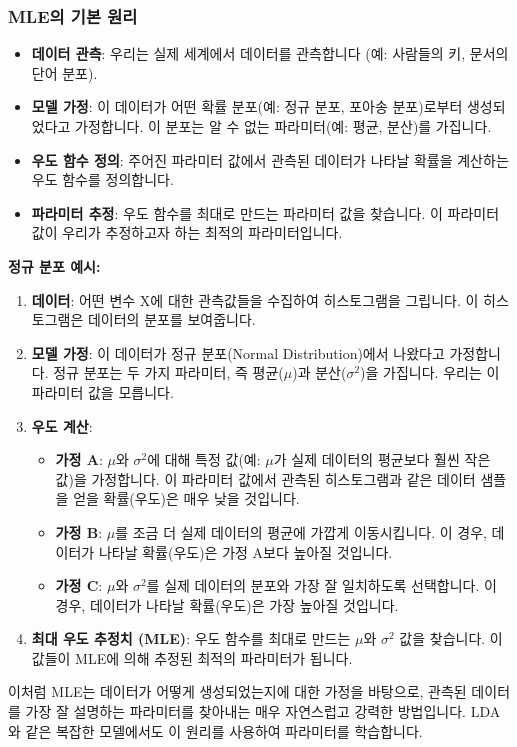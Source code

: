 \documentclass[11pt,a4paper]{article}
\theoremstyle{definition}
\begin{document}
\subsubsection*{MLE의 기본 원리}
\begin{itemize}
    \item \textbf{데이터 관측}: 우리는 실제 세계에서 데이터를 관측합니다 (예: 사람들의 키, 문서의 단어 분포).
    \item \textbf{모델 가정}: 이 데이터가 어떤 확률 분포(예: 정규 분포, 포아송 분포)로부터 생성되었다고 가정합니다. 이 분포는 알 수 없는 파라미터(예: 평균, 분산)를 가집니다.
    \item \textbf{우도 함수 정의}: 주어진 파라미터 값에서 관측된 데이터가 나타날 확률을 계산하는 우도 함수를 정의합니다.
    \item \textbf{파라미터 추정}: 우도 함수를 최대로 만드는 파라미터 값을 찾습니다. 이 파라미터 값이 우리가 추정하고자 하는 최적의 파라미터입니다.
\end{itemize}

\begin{examplebox}
\textbf{정규 분포 예시:}
\begin{enumerate}
    \item \textbf{데이터}: 어떤 변수 X에 대한 관측값들을 수집하여 히스토그램을 그립니다. 이 히스토그램은 데이터의 분포를 보여줍니다.
    \item \textbf{모델 가정}: 이 데이터가 정규 분포(Normal Distribution)에서 나왔다고 가정합니다. 정규 분포는 두 가지 파라미터, 즉 평균($\mu$)과 분산($\sigma^2$)을 가집니다. 우리는 이 파라미터 값을 모릅니다.
    \item \textbf{우도 계산}:
    \begin{itemize}
        \item \textbf{가정 A}: $\mu$와 $\sigma^2$에 대해 특정 값(예: $\mu$가 실제 데이터의 평균보다 훨씬 작은 값)을 가정합니다. 이 파라미터 값에서 관측된 히스토그램과 같은 데이터 샘플을 얻을 확률(우도)은 매우 낮을 것입니다.
        \item \textbf{가정 B}: $\mu$를 조금 더 실제 데이터의 평균에 가깝게 이동시킵니다. 이 경우, 데이터가 나타날 확률(우도)은 가정 A보다 높아질 것입니다.
        \item \textbf{가정 C}: $\mu$와 $\sigma^2$를 실제 데이터의 분포와 가장 잘 일치하도록 선택합니다. 이 경우, 데이터가 나타날 확률(우도)은 가장 높아질 것입니다.
    \end{itemize}
    \item \textbf{최대 우도 추정치 (MLE)}: 우도 함수를 최대로 만드는 $\mu$와 $\sigma^2$ 값을 찾습니다. 이 값들이 MLE에 의해 추정된 최적의 파라미터가 됩니다.
\end{enumerate}
이처럼 MLE는 데이터가 어떻게 생성되었는지에 대한 가정을 바탕으로, 관측된 데이터를 가장 잘 설명하는 파라미터를 찾아내는 매우 자연스럽고 강력한 방법입니다. LDA와 같은 복잡한 모델에서도 이 원리를 사용하여 파라미터를 학습합니다.
\end{examplebox}
\end{document}
